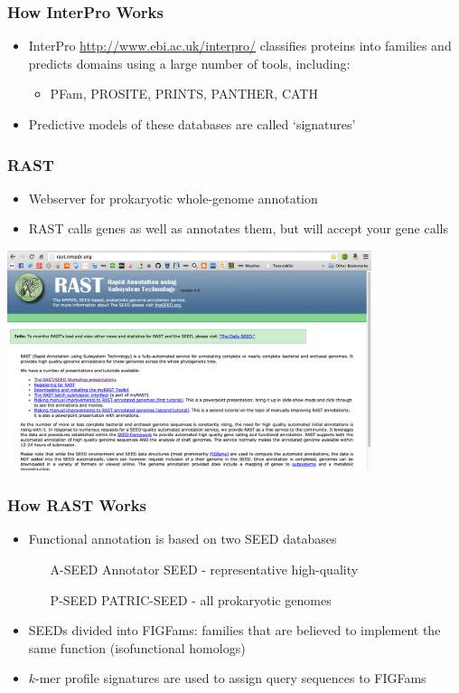     \begin{frame}
      \frametitle{How InterPro Works}   
      \begin{itemize}
        \item InterPro \url{http://www.ebi.ac.uk/interpro/} classifies proteins into families and predicts domains using a large number of tools, including:
        \begin{itemize}
          \item PFam, PROSITE, PRINTS, PANTHER, CATH
        \end{itemize}
        \item Predictive models of these databases are called `signatures'
      \end{itemize}
    \end{frame}

    \begin{frame}
      \frametitle{RAST}   
      \begin{itemize}
        \item Webserver for prokaryotic whole-genome annotation
        \item RAST calls genes as well as annotates them, but will accept your gene calls
      \end{itemize}
      \begin{center}
        \includegraphics[width=0.8\textwidth]{images/rast} 
      \end{center}        
    \end{frame}

    \begin{frame}
      \frametitle{How RAST Works}   
      \begin{itemize} 
        \item Functional annotation is based on two SEED databases
        \begin{itemize}
          \item [A-SEED] Annotator SEED - representative high-quality
          \item [P-SEED] PATRIC-SEED - all prokaryotic genomes
        \end{itemize}
        \item SEEDs divided into FIGFams: families that are believed to implement the same function (isofunctional homologs)
        \item $k$-mer profile signatures are used to assign query sequences to FIGFams
      \end{itemize}
    \end{frame}

